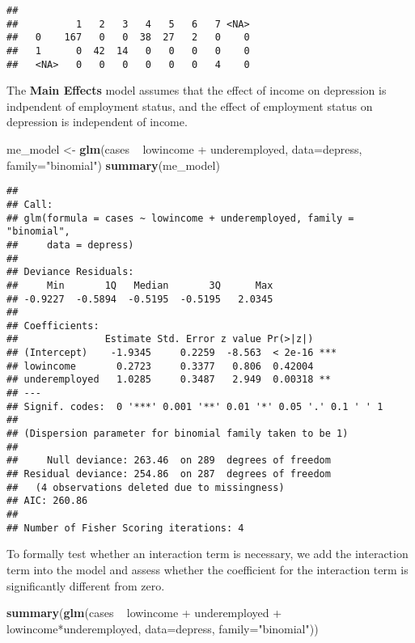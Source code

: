 \documentclass[]{article}
\newenvironment{Shaded}{\begin{snugshade}}{\end{snugshade}}
\newcommand{\KeywordTok}[1]{\textcolor[rgb]{0.13,0.29,0.53}{\textbf{{#1}}}}
\newcommand{\DataTypeTok}[1]{\textcolor[rgb]{0.13,0.29,0.53}{{#1}}}
\newcommand{\StringTok}[1]{\textcolor[rgb]{0.31,0.60,0.02}{{#1}}}
\newcommand{\NormalTok}[1]{{#1}}
\begin{document}
\begin{verbatim}
##       
##          1   2   3   4   5   6   7 <NA>
##   0    167   0   0  38  27   2   0    0
##   1      0  42  14   0   0   0   0    0
##   <NA>   0   0   0   0   0   0   4    0
\end{verbatim}

The \textbf{Main Effects} model assumes that the effect of income on
depression is indpendent of employment status, and the effect of
employment status on depression is independent of income.

\begin{Shaded}
\begin{Highlighting}[]
\NormalTok{me_model <-}\StringTok{ }\KeywordTok{glm}\NormalTok{(cases ~}\StringTok{ }\NormalTok{lowincome +}\StringTok{ }\NormalTok{underemployed, }\DataTypeTok{data=}\NormalTok{depress, }\DataTypeTok{family=}\StringTok{"binomial"}\NormalTok{)}
\KeywordTok{summary}\NormalTok{(me_model)}
\end{Highlighting}
\end{Shaded}

\begin{verbatim}
## 
## Call:
## glm(formula = cases ~ lowincome + underemployed, family = "binomial", 
##     data = depress)
## 
## Deviance Residuals: 
##     Min       1Q   Median       3Q      Max  
## -0.9227  -0.5894  -0.5195  -0.5195   2.0345  
## 
## Coefficients:
##               Estimate Std. Error z value Pr(>|z|)    
## (Intercept)    -1.9345     0.2259  -8.563  < 2e-16 ***
## lowincome       0.2723     0.3377   0.806  0.42004    
## underemployed   1.0285     0.3487   2.949  0.00318 ** 
## ---
## Signif. codes:  0 '***' 0.001 '**' 0.01 '*' 0.05 '.' 0.1 ' ' 1
## 
## (Dispersion parameter for binomial family taken to be 1)
## 
##     Null deviance: 263.46  on 289  degrees of freedom
## Residual deviance: 254.86  on 287  degrees of freedom
##   (4 observations deleted due to missingness)
## AIC: 260.86
## 
## Number of Fisher Scoring iterations: 4
\end{verbatim}

To formally test whether an interaction term is necessary, we add the
interaction term into the model and assess whether the coefficient for
the interaction term is significantly different from zero.

\begin{Shaded}
\begin{Highlighting}[]
\KeywordTok{summary}\NormalTok{(}\KeywordTok{glm}\NormalTok{(cases ~}\StringTok{ }\NormalTok{lowincome +}\StringTok{ }\NormalTok{underemployed +}\StringTok{ }\NormalTok{lowincome*underemployed, }\DataTypeTok{data=}\NormalTok{depress, }\DataTypeTok{family=}\StringTok{"binomial"}\NormalTok{))}
\end{Highlighting}
\end{Shaded}
\end{document}
